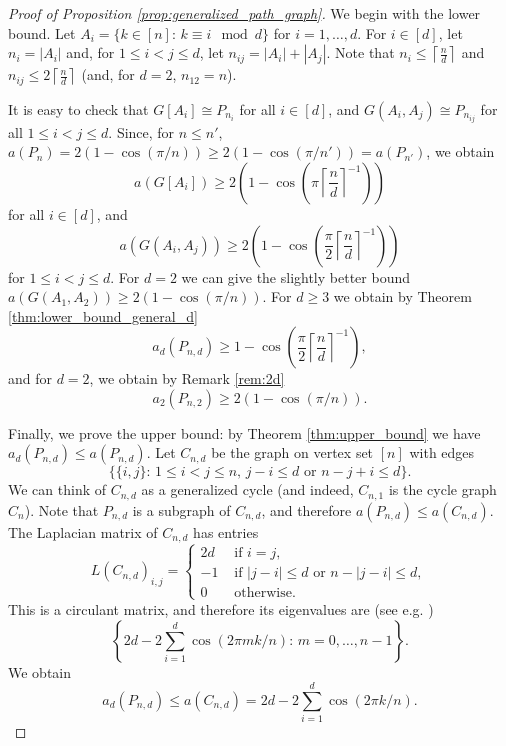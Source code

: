\documentclass[a4paper,11pt]{article}
\theoremstyle{plain}
\theoremstyle{definition}
\newcommand{\ufrac}[2]{\left\lceil\frac{#1}{#2}\right\rceil}
\begin{document}
\begin{proof}[Proof of Proposition \ref{prop:generalized_path_graph}]
We begin with the lower bound. Let $A_i= \{k\in[n]:\, k\equiv i \mod d\}$ for $i=1,\ldots,d$. For $i\in[d]$, let $n_i=|A_i|$ and, for $1\leq i<j\leq d$, let $n_{ij}=|A_i|+|A_j|$. Note that $n_i\leq \ufrac{n}{d}$ and $n_{ij}\leq 2\ufrac{n}{d}$ (and, for $d=2$, $n_{12}=n$).

It is easy to check that $G[A_i]\cong P_{n_i}$ for all $i\in[d]$, and $G(A_i,A_j)\cong P_{n_{ij}}$ for all $1\leq i<j\leq d$. Since, for $n\leq n'$, $a(P_n)=2(1-\cos(\pi/n))\geq 2(1-\cos(\pi/n'))=a(P_{n'})$, we obtain
\[
    a(G[A_i])\geq 2\left(1-\cos\left(\pi\ufrac{n}{d}^{-1}\right)\right)
\]
for all $i\in[d]$, and
\[
    a(G(A_i,A_j))\geq 2\left(1-\cos\left(\frac{\pi}{2}\ufrac{n}{d}^{-1}\right)\right)
\]
for $1\leq i<j\leq d$. For $d=2$ we can give the slightly better bound $a(G(A_1,A_2))\geq 2(1-\cos(\pi/n))$. 
For $d\geq 3$ we obtain by Theorem \ref{thm:lower_bound_general_d}
\[
    a_d(P_{n,d})\geq 1-\cos\left(\frac{\pi}{2}\ufrac{n}{d}^{-1}\right),
\]
and for $d=2$, we obtain by Remark \ref{rem:2d}
\[
    a_2(P_{n,2})\geq 2(1-\cos(\pi/n)).
\]

Finally, we prove the upper bound: by Theorem \ref{thm:upper_bound} we have $a_d(P_{n,d})\leq a(P_{n,d})$. Let $C_{n,d}$ be the graph on vertex set $[n]$ with edges \[\{\{i,j\}:\, 1\leq i<j\leq n,\, j-i\leq d \text{ or } n-j+i\leq d\}.\]
We can think of $C_{n,d}$ as a generalized cycle (and indeed, $C_{n,1}$ is the cycle graph $C_n$). Note that $P_{n,d}$ is a subgraph of $C_{n,d}$, and therefore $a(P_{n,d})\leq a(C_{n,d})$. The Laplacian matrix of $C_{n,d}$ has entries
\[
    L(C_{n,d})_{i,j}=\begin{cases}
                        2d & \text{ if } i=j,\\
                        -1 & \text{ if } |j-i|\leq d \text{ or } n-|j-i|\leq d,\\
                        0 & \text{ otherwise.}
    \end{cases}
\]
This is a circulant matrix, and therefore its eigenvalues are (see e.g. \cite{gray2006toeplitz})
\[
   \left\{ 2d- 2\sum_{i=1}^d \cos(2\pi m k /n):\, m=0,\ldots,n-1\right\}.
\]
We obtain
\[
a_d(P_{n,d})\leq a(C_{n,d})=2d- 2\sum_{i=1}^d \cos(2\pi k /n).
\]
\end{proof}
\end{document}
